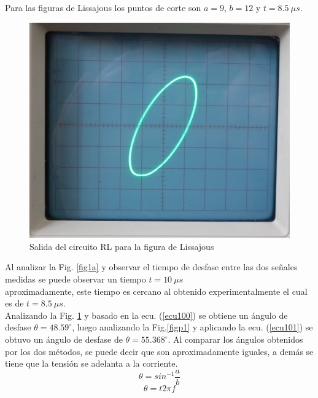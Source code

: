 \documentclass[twocolumn]{IEEEtran}
\begin{document}
\noindent
Para las figuras de Lissajous los puntos de corte son $a = 9$, $b= 12$ y $t=8.5\ \mu s$.
\begin{figure}[H]
	\centering
		\includegraphics[scale=0.15]{233.png}
	\caption{Salida del circuito RL para la figura de Lissajous}
	\label{figp2}
\end{figure}
\noindent
Al analizar la Fig. \ref{fig1a} y observar el tiempo de desfase entre las dos señales medidas se puede observar un tiempo $t=10\ \mu s$\\ aproximadamente, este tiempo es cercano al obtenido experimentalmente el cual es de $t=8.5\ \mu s$.\\
Analizando la Fig. \ref{figp2} y basado en la ecu. (\ref{ecu100}) se obtiene un ángulo de desfase $\theta = 48.59 ^\circ$, luego analizando la Fig.\ref{figp1} y aplicando la ecu. (\ref{ecu101}) se obtuvo un ángulo de desfase de $\theta = 55.368 ^\circ$. Al comparar los ángulos obtenidos por los dos métodos, se puede decir que son aproximadamente iguales, a demás se tiene que la tensión se adelanta a la corriente.
\begin{equation}
 \theta = sin ^{-1} \frac{a}{b}
\label{ecu100}
\end{equation}
\begin{equation}
 \theta = t 2 \pi f
\label{ecu101}
\end{equation}
\end{document}
